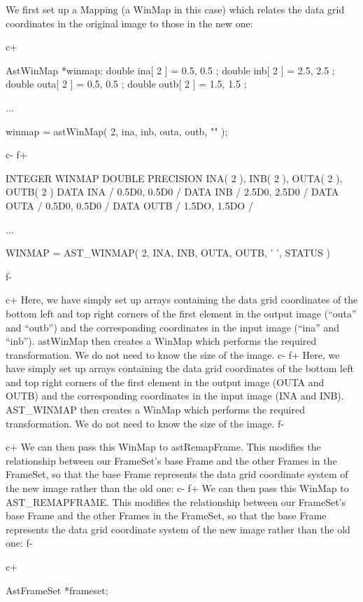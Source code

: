 \documentclass[twoside,11pt]{starlink}
\begin{document}
{We first set up a Mapping (a WinMap in this case) which relates the
data grid coordinates in the original image to those in the new one:

c+
\small
\begin{terminalv}
AstWinMap *winmap;
double ina[ 2 ] = { 0.5, 0.5 };
double inb[ 2 ] = { 2.5, 2.5 };
double outa[ 2 ] = { 0.5, 0.5 };
double outb[ 2 ] = { 1.5, 1.5 };

...

winmap = astWinMap( 2, ina, inb, outa, outb, "" );
\end{terminalv}
\normalsize
c-
f+
\small
\begin{terminalv}
      INTEGER WINMAP
      DOUBLE PRECISION INA( 2 ), INB( 2 ), OUTA( 2 ), OUTB( 2 )
      DATA INA / 0.5D0, 0.5D0 /
      DATA INB / 2.5D0, 2.5D0 /
      DATA OUTA / 0.5D0, 0.5D0 /
      DATA OUTB / 1.5DO, 1.5DO /

      ...

      WINMAP = AST_WINMAP( 2, INA, INB, OUTA, OUTB, ' ', STATUS )
\end{terminalv}
\normalsize
f-

c+
Here, we have simply set up arrays containing the data grid
coordinates of the bottom left and top right corners of the first
element in the output image (``outa'' and ``outb'') and the
corresponding coordinates in the input image (``ina'' and
``inb''). astWinMap then creates a WinMap which performs the required
transformation. We do not need to know the size of the image.
c-
f+
Here, we have simply set up arrays containing the data grid
coordinates of the bottom left and top right corners of the first
element in the output image (OUTA and OUTB) and the corresponding
coordinates in the input image (INA and INB). AST\_WINMAP then creates
a WinMap which performs the required transformation. We do not need to
know the size of the image.
f-

c+
We can then pass this WinMap to astRemapFrame. This modifies the
relationship between our FrameSet's base Frame and the other Frames in
the FrameSet, so that the base Frame represents the data grid
coordinate system of the new image rather than the old one:
c-
f+
We can then pass this WinMap to AST\_REMAPFRAME. This modifies the
relationship between our FrameSet's base Frame and the other Frames in
the FrameSet, so that the base Frame represents the data grid
coordinate system of the new image rather than the old one:
f-

c+
\small
\begin{terminalv}
AstFrameSet *frameset;


\end{terminalv}}
\end{document}

